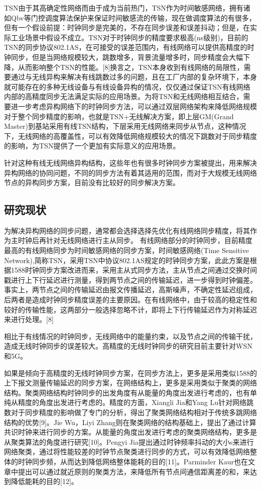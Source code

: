 \documentclass[UTF8,a4paper,12pt]{ctexart}
\numberwithin{equation}{section}
\begin{document}
TSN由于其高确定性网络而由于成为当前热门，TSN作为时间敏感网络，拥有诸如Qbv等门控调度算法保护来保证时间敏感流的传输，现在做调度算法的有很多，但有一个假设前提：时钟同步是完美的，不存在同步误差和误差抖动；但是，在实际工业场景中假设不成立。TSN对于时钟同步的精度要求极高(ns级别)，目前的TSN的同步协议802.1AS，在可接受的误差范围内，有线网络可以提供高精度的时钟同步，但是当网络规模较大，跳数增多，背景流量增多时，同步精度会大幅下降，从而影响整个TSN的性能。[8]换言之，TSN本身收到有线网络的局限性，需要通过与无线异构来解决有线跳数过多的问题，且在工厂内部的复杂环境下，本身就可能存在的多种无线设备与有线设备异构的情况，仅仅通过保证TSN有线网络内部的高精度同步无法满足实际的应用场景。为将TSN和无线网络相互结合，需要进一步考虑异构网络下的时钟同步方法，可以通过双层网络架构来降低网络规模对于整个同步精度的影响，也就是TSN+无线解决方案，即上层GM(Grand Master)到基站采用有线TSN结构，下层采用无线网络来同步从节点，这种情况下，无线网络的高覆盖性，可以有效降低网络规模较大的情况下跳数对于同步精度的影响，为TSN提供了一个更加有实际意义的应用场景。


针对这种有线无线网络异构结构，这些年也有很多时钟同步方案被提出，用来解决异构网络的协同问题，不同的同步方法有着其适用的范围，而对于大规模无线网络节点的异构同步方案，目前没有比较好的同步解决方案。

\subsection{研究现状}
为解决异构网络的同步问题，通常都会选择选择先优化有线网络同步精度，将其作为主时钟后再针对无线网络进行主从同步。
有线网络部分的时钟同步，目前精度最高的有线网络同步为时间敏感网络的同步方案，时间敏感网络(Time Sensitive Network),简称TSN，采用TSN中协议802.1AS规定的时钟同步方案，此此方案是根据1588时钟同步方案改进而来，采用主从式同步方法，主从节点之间通过交换时间戳进行上下行延迟进行测量，得到两节点之间的传输延迟，进一步得到时钟偏差。事实上，两节点之间的传输延迟由报文传播延迟，高斯噪声，不确定性延迟组成，后两者是造成时钟同步精度误差的主要原因。在有线网络中，由于较高的稳定性和较好的传输性能，这两部分一般选择忽略不计，即将上下行传输延迟作为对称延迟来进行处理。[8]


相比于有线情况的时钟同步，无线网络中的能量约束，以及节点之间的传输干扰，造成无线时钟同步的误差较大。高精度的无线时钟同步的研究目前主要针对WSN和5G。

如果是倾向于高精度的无线时钟同步方案，在同步方法上，更多是采用类似1588的上下报文测量传输延迟的同步方案，在网络结构上，更多是采用类似于聚类的网络结构。聚类网络结构时钟同步的出发角度有从能量的角度出发进行考虑的，也有单纯从精度的角度出发进行考虑的。精度的方面，Xiangli Jia和Yang Lu针对网络跳数对于同步精度的影响做了专门的分析，得出了聚类网络结构相对于传统多跳网络结构的优势[9]。Jie Wu，Liyi Zhang则在聚类网络的结构基础上，提出了通过计算共识时钟来进行同步的方案。从能量的角度出发进行考虑的聚类网络结构，更多是从聚类算法的角度进行研究[10]。Pengyi Jia提出通过时钟频率抖动的大小s来进行网络聚类，通过将性能较差的时钟节点聚类进行同步的方式，可以有效降低网络整体的时钟同步频，从而达到降低网络整体能耗的目的[11]。Parminder Kaur也在文章中提出可以通过就近原则的聚类方法，来降低所有节点间通信距离差的和，来达到降低能耗的目的[12]。
\end{document}
